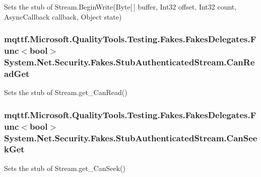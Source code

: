 Sets the stub of Stream.\-Begin\-Write(\-Byte\mbox{[}$\,$\mbox{]} buffer, Int32 offset, Int32 count, Async\-Callback callback, Object state)

\hypertarget{class_system_1_1_net_1_1_security_1_1_fakes_1_1_stub_authenticated_stream_a395c8a154cfb59f34d33692baadc012b}{
\subsubsection[{Can\-Read\-Get}]{\setlength{\rightskip}{0pt plus 5cm}mqttf.\-Microsoft.\-Quality\-Tools.\-Testing.\-Fakes.\-Fakes\-Delegates.\-Func$<$bool$>$ System.\-Net.\-Security.\-Fakes.\-Stub\-Authenticated\-Stream.\-Can\-Read\-Get}}\label{class_system_1_1_net_1_1_security_1_1_fakes_1_1_stub_authenticated_stream_a395c8a154cfb59f34d33692baadc012b}


Sets the stub of Stream.\-get\-\_\-\-Can\-Read()

\hypertarget{class_system_1_1_net_1_1_security_1_1_fakes_1_1_stub_authenticated_stream_a666ef53e0b8a0456edff5806439eeade}{
\subsubsection[{Can\-Seek\-Get}]{\setlength{\rightskip}{0pt plus 5cm}mqttf.\-Microsoft.\-Quality\-Tools.\-Testing.\-Fakes.\-Fakes\-Delegates.\-Func$<$bool$>$ System.\-Net.\-Security.\-Fakes.\-Stub\-Authenticated\-Stream.\-Can\-Seek\-Get}}\label{class_system_1_1_net_1_1_security_1_1_fakes_1_1_stub_authenticated_stream_a666ef53e0b8a0456edff5806439eeade}


Sets the stub of Stream.\-get\-\_\-\-Can\-Seek()

